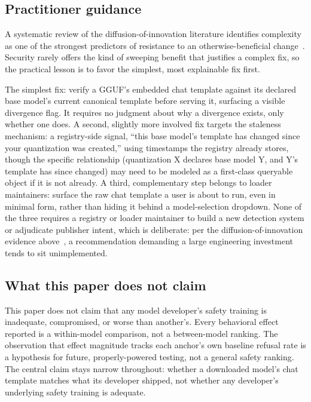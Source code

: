 \documentclass[letterpaper,twocolumn,10pt]{article}
\begin{document}
\subsection{Practitioner guidance}

A systematic review of the diffusion-of-innovation literature identifies complexity as one of the strongest predictors of resistance to an otherwise-beneficial change~\cite{greenhalgh2004diffusion}. Security rarely offers the kind of sweeping benefit that justifies a complex fix, so the practical lesson is to favor the simplest, most explainable fix first.

The simplest fix: verify a GGUF's embedded chat template against its declared base model's current canonical template before serving it, surfacing a visible divergence flag. It requires no judgment about why a divergence exists, only whether one does. A second, slightly more involved fix targets the staleness mechanism: a registry-side signal, ``this base model's template has changed since your quantization was created,'' using timestamps the registry already stores, though the specific relationship (quantization X declares base model Y, and Y's template has since changed) may need to be modeled as a first-class queryable object if it is not already. A third, complementary step belongs to loader maintainers: surface the raw chat template a user is about to run, even in minimal form, rather than hiding it behind a model-selection dropdown. None of the three requires a registry or loader maintainer to build a new detection system or adjudicate publisher intent, which is deliberate: per the diffusion-of-innovation evidence above~\cite{greenhalgh2004diffusion}, a recommendation demanding a large engineering investment tends to sit unimplemented.

\subsection{What this paper does not claim}

This paper does not claim that any model developer's safety training is inadequate, compromised, or worse than another's. Every behavioral effect reported is a within-model comparison, not a between-model ranking. The observation that effect magnitude tracks each anchor's own baseline refusal rate is a hypothesis for future, properly-powered testing, not a general safety ranking. The central claim stays narrow throughout: whether a downloaded model's chat template matches what its developer shipped, not whether any developer's underlying safety training is adequate.
\end{document}
